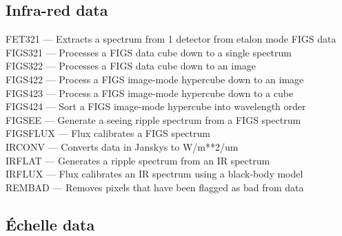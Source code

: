 \documentclass[11pt,twoside]{article}
\newcommand{\htmlref}[2]{#1}
\begin{document}

\subsection{\label{classifinfra}Infra-red data}

\htmlref{FET321}{FET321} --- Extracts a spectrum from 1 detector from etalon mode FIGS data\\
\htmlref{FIGS321}{FIGS321} --- Processes a FIGS data cube down to a single spectrum\\
\htmlref{FIGS322}{FIGS322} --- Processes a FIGS data cube down to an image\\
\htmlref{FIGS422}{FIGS422} --- Process a FIGS image-mode hypercube down to an image\\
\htmlref{FIGS423}{FIGS423} --- Process a FIGS image-mode hypercube down to a cube\\
\htmlref{FIGS424}{FIGS424} --- Sort a FIGS image-mode hypercube into wavelength order\\
\htmlref{FIGSEE}{FIGSEE} --- Generate a seeing ripple spectrum from a FIGS spectrum\\
\htmlref{FIGSFLUX}{FIGSFLUX} --- Flux calibrates a FIGS spectrum\\
\htmlref{IRCONV}{IRCONV} --- Converts data in Janskys to W/m**2/um\\
\htmlref{IRFLAT}{IRFLAT} --- Generates a ripple spectrum from an IR spectrum\\
\htmlref{IRFLUX}{IRFLUX} --- Flux calibrates an IR spectrum using a black-body model\\
\htmlref{REMBAD}{REMBAD} --- Removes pixels that have been flagged as bad from data


\subsection{\label{classifechelle}\'Echelle data}
\end{document}
